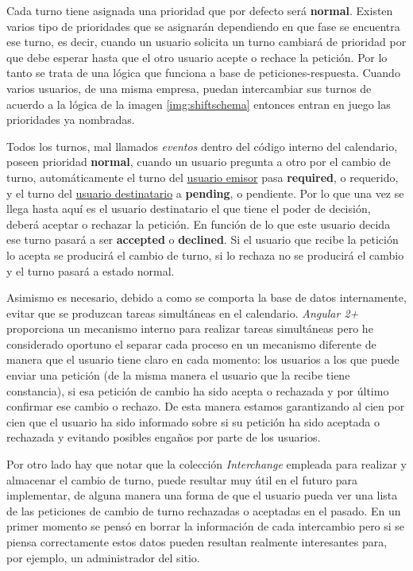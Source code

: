  \label{img:shiftschema}
 
Cada turno tiene asignada una prioridad que por defecto será  \textbf{normal}. Existen varios tipo de prioridades que se asignarán dependiendo en que fase se encuentra ese turno, es decir, cuando un usuario solicita un turno cambiará de prioridad por que debe esperar hasta que el otro usuario acepte o rechace la petición. Por lo tanto se trata de una lógica que funciona a base de peticiones-respuesta. Cuando varios usuarios, de una misma empresa, puedan intercambiar sus turnos de acuerdo a la lógica de la imagen \ref{img:shiftschema} entonces entran en juego las prioridades ya nombradas.  

 
 Todos los turnos, mal llamados \emph{eventos} dentro del código interno del calendario, poseen prioridad \textbf{normal}, cuando un usuario pregunta a otro por el cambio de turno, automáticamente el turno del \underline{usuario emisor} pasa \textbf{required}, o requerido, y el turno del \underline{usuario destinatario} a \textbf{pending}, o pendiente. Por lo que una vez se llega hasta aquí es el usuario destinatario el que tiene el poder de decisión, deberá aceptar o rechazar la petición. En función de lo que este usuario decida ese turno pasará a ser \textbf{accepted} o \textbf{declined}. Si el usuario que recibe la petición lo acepta se producirá el cambio de turno, si lo rechaza no se producirá el cambio y el turno pasará a estado normal.
 
 Asimismo es necesario, debido a como se comporta la base de datos internamente, evitar que se produzcan tareas simultáneas en el calendario. \emph{Angular 2+} proporciona un mecanismo interno para realizar tareas simultáneas pero he considerado oportuno el separar cada proceso en un mecanismo diferente de manera que el usuario tiene claro en cada momento: los usuarios a los que puede enviar una petición (de la misma manera el usuario que la recibe tiene constancia), si esa petición de cambio ha sido acepta o rechazada y por último confirmar ese cambio o rechazo. De esta manera estamos garantizando al cien por cien que el usuario ha sido informado sobre si su petición ha sido aceptada o rechazada y evitando posibles engaños por parte de los usuarios.
 
 Por otro lado hay que notar que la colección \emph{Interchange} empleada para realizar y almacenar el cambio de turno, puede resultar muy útil en el futuro para implementar, de alguna manera una forma de que el usuario pueda ver una lista de las peticiones de cambio de turno rechazadas o aceptadas en el pasado. En un primer momento se pensó en borrar la información de cada intercambio pero si se piensa correctamente estos datos pueden resultan realmente interesantes para, por ejemplo, un administrador del sitio. 
 

